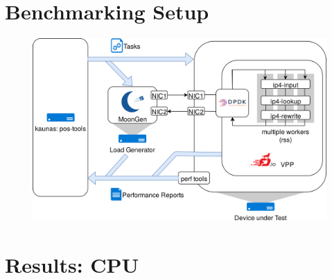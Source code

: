 \section{Benchmarking Setup}

\begin{frame}
    \begin{figure}
    \vspace{5mm}
    \noindent\hspace{1mm}\includegraphics[width=0.9\linewidth]{pics/topology.png}
    \label{setup}
    \end{figure}
\end{frame}


\section{Results: CPU}


